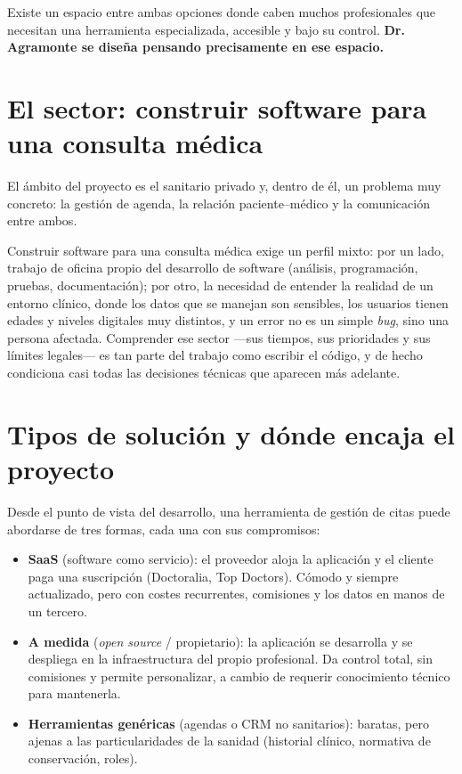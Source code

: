 \documentclass[12pt,a4paper]{report}
\begin{document}
Existe un espacio entre ambas opciones donde caben muchos profesionales que necesitan una herramienta especializada, accesible y bajo su control. \textbf{Dr. Agramonte se diseña pensando precisamente en ese espacio.}

\section{El sector: construir software para una consulta médica}

El ámbito del proyecto es el sanitario privado y, dentro de él, un problema muy concreto: la gestión de agenda, la relación paciente--médico y la comunicación entre ambos.

Construir software para una consulta médica exige un perfil mixto: por un lado, trabajo de oficina propio del desarrollo de software (análisis, programación, pruebas, documentación); por otro, la necesidad de entender la realidad de un entorno clínico, donde los datos que se manejan son sensibles, los usuarios tienen edades y niveles digitales muy distintos, y un error no es un simple \emph{bug}, sino una persona afectada. Comprender ese sector —sus tiempos, sus prioridades y sus límites legales— es tan parte del trabajo como escribir el código, y de hecho condiciona casi todas las decisiones técnicas que aparecen más adelante.

\section{Tipos de solución y dónde encaja el proyecto}

Desde el punto de vista del desarrollo, una herramienta de gestión de citas puede abordarse de tres formas, cada una con sus compromisos:

\begin{itemize}
  \item \textbf{SaaS} (software como servicio): el proveedor aloja la aplicación y el cliente paga una suscripción (Doctoralia, Top Doctors). Cómodo y siempre actualizado, pero con costes recurrentes, comisiones y los datos en manos de un tercero.
  \item \textbf{A medida} (\emph{open source} / propietario): la aplicación se desarrolla y se despliega en la infraestructura del propio profesional. Da control total, sin comisiones y permite personalizar, a cambio de requerir conocimiento técnico para mantenerla.
  \item \textbf{Herramientas genéricas} (agendas o CRM no sanitarios): baratas, pero ajenas a las particularidades de la sanidad (historial clínico, normativa de conservación, roles).
\end{itemize}
\end{document}
